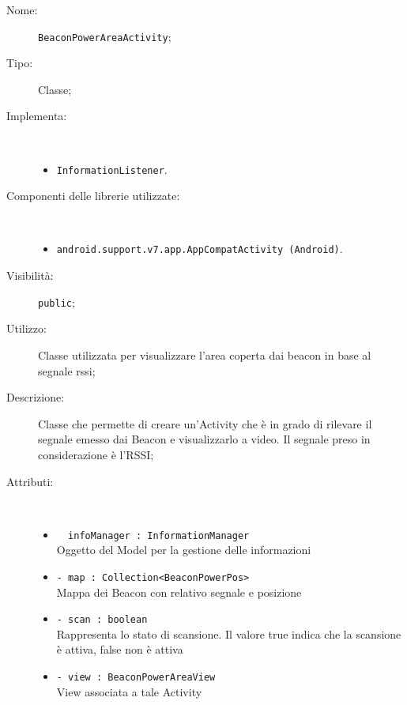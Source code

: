\documentclass[../DefinizioneDiProdotto.tex]{subfiles}
\begin{document}
\begin{description}
	\item[Nome:] \texttt{BeaconPowerAreaActivity};
	\item[Tipo:] Classe;
	\item[Implementa:] \
	\begin{itemize}
		\item \texttt{InformationListener}.
		
	\end{itemize}
	\item[Componenti delle librerie utilizzate:] \
	\begin{itemize}
		\item \texttt{android.support.v7.app.AppCompatActivity (Android)}.
		
	\end{itemize}
	\item[Visibilità:] \texttt{public};
	\item[Utilizzo:] Classe utilizzata per visualizzare l'area coperta dai beacon in base al segnale rssi;
	\item[Descrizione:] Classe che permette di creare un'Activity che è in grado di rilevare il segnale emesso dai Beacon e visualizzarlo a video. Il segnale preso in considerazione è l'RSSI;
	\item[Attributi:] \
	\begin{itemize}
		\item \texttt{~ infoManager : InformationManager}\\
		Oggetto del Model per la gestione delle informazioni
		
		\item \texttt{- map : Collection<BeaconPowerPos>}\\
		Mappa dei Beacon con relativo segnale e posizione
		
		\item \texttt{- scan : boolean}\\
		Rappresenta lo stato di scansione. Il valore true indica che la scansione è attiva, false non è attiva
		
		\item \texttt{- view : BeaconPowerAreaView}\\
		View associata a tale Activity
		

\end{itemize}
\end{description}
\end{document}
